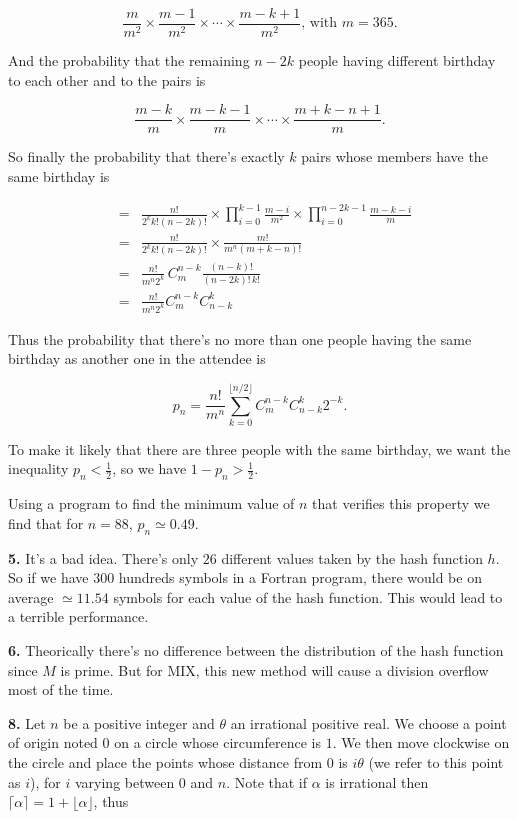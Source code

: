 \documentclass[a4paper,12pt]{article}
\newcommand{\newpar}[1]{\bigskip \noindent \textbf{#1.}}
\begin{document}
\[ \frac{m}{m^2} \times \frac{m-1}{m^2} \times \cdots \times
\frac{m-k+1}{m^2},\,\mbox{with $m = 365$}.\]

And the probability that the remaining $n-2k$ people having different
birthday to each other and to the pairs is

\[ \frac{m-k}{m} \times \frac{m-k-1}{m} \times \cdots \times
\frac{m+k-n+1}{m}.\]

So finally the probability that there's exactly $k$ pairs whose
members have the same birthday is

\begin{eqnarray*}
  &=& \frac{n!}{2^kk!(n-2k)!}\times \prod_{i=0}^{k-1}\frac{m-i}{m^2}
  \times \prod_{i=0}^{n-2k-1} \frac{m-k-i}{m} \\
  &=& \frac{n!}{2^kk!(n-2k)!} \times \frac{m!}{m^n(m+k-n)!} \\
  &=& \frac{n!}{m^n2^k}\,C_m^{n-k} \frac{(n-k)!}{(n-2k)!\,k!} \\
  &=& \frac{n!}{m^n2^k} C_m^{n-k} C_{n-k}^k
\end{eqnarray*}

Thus the probability that there's no more than one people having the
same birthday as another one in the attendee is

\[ p_n = \frac{n!}{m^n} \sum_{k=0}^{\lfloor n/2\rfloor}
C_m^{n-k}C_{n-k}^k 2^{-k}.\]

To make it likely that there are three people with the same birthday,
we want the inequality $p_n < \frac{1}{2}$, so we have $1-p_n >
\frac{1}{2}$.

Using a program to find the minimum value of $n$ that verifies this
property we find that for $n = 88$, $p_n \simeq 0.49$.

\newpar{5} It's a bad idea.  There's only $26$ different values taken
by the hash function $h$.  So if we have $300$ hundreds symbols in a
Fortran program, there would be on average $\simeq 11.54$ symbols for
each value of the hash function.  This would lead to a terrible
performance.

\newpar{6} Theorically there's no difference between the distribution
of the hash function since $M$ is prime.  But for MIX, this new method
will cause a division overflow most of the time.

\newpar{8} Let $n$ be a positive integer and $\theta$ an irrational
positive real.  We choose a point of origin noted $0$ on a circle
whose circumference is $1$.  We then move clockwise on the circle and
place the points whose distance from $0$ is $i\theta$ (we refer to
this point as $i$), for $i$ varying between $0$ and $n$.  Note that if
$\alpha$ is irrational then $\lceil \alpha\rceil = 1+\lfloor
\alpha\rfloor$, thus
\end{document}
